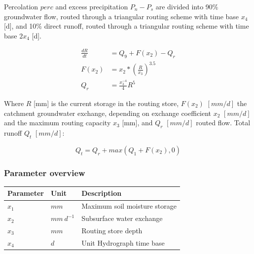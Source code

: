 Percolation $perc$ and excess precipitation $P_n - P_s$ are divided into 90\% groundwater flow, routed through a triangular routing scheme with time base $x_4$ [d], and 10\% direct runoff, routed through a triangular routing scheme with time base $2x_4$ [d].

\begin{align}
	\frac{dR}{dt} &= Q_{9} + F(x_2) -Q_r\\
	F(x_2) &= x_2*\left(\frac{R}{x_3}\right)^{3.5} \\	
	Q_r &= \frac{x_3^{-4}}{4}R^5
\end{align}

Where $R$ [mm] is the current storage in the routing store, $F(x_2)$ $[mm/d]$ the catchment groundwater exchange, depending on exchange coefficient $x_2$ $[mm/d]$ and the maximum routing capacity $x_3$ [mm], and $Q_r$ $[mm/d]$ routed flow. Total runoff $Q_t$ $[mm/d]$: 

\begin{equation}
	Q_t = Q_r + max(Q_1+F(x_2),0)
\end{equation} 

\subsubsection{Parameter overview}
\begin{table}[htbp]
  \centering
    \begin{tabular}{lll}
    \toprule
    Parameter & Unit  & Description \\
    \midrule
    $x_1$ & $mm$  & Maximum soil moisture storage \\
    $x_2$ & $mm~d^{-1}$ & Subsurface water exchange \\
    $x_3$ & $mm$  & Routing store depth \\
    $x_4$ & $d$   & Unit Hydrograph time base \\
    \bottomrule
    \end{tabular}%
  \label{tab:addlabel}%
\end{table}%

